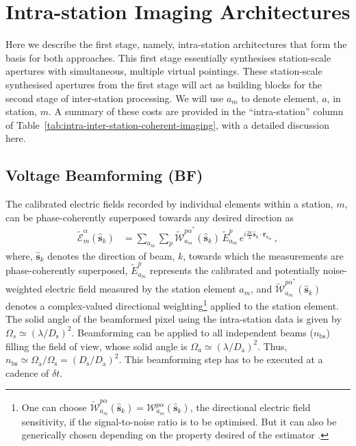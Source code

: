 \documentclass[
  journal=pasa,
  manuscript=article-type,
  year=2020,
  volume=37,
]{cup-journal}
\begin{document}
\section{Intra-station Imaging Architectures} \label{sec:intra-station-arch}

Here we describe the first stage, namely, intra-station architectures that form the basis for both approaches. This first stage essentially synthesises station-scale apertures with simultaneous, multiple virtual pointings. These station-scale synthesised apertures from the first stage will act as building blocks for the second stage of inter-station processing. We will use $a_m$ to denote element, $a$, in station, $m$. A summary of these costs are provided in the ``intra-station'' column of Table~\ref{tab:intra-inter-station-coherent-imaging}, with a detailed discussion here. 

\subsection{Voltage Beamforming (BF)}

The calibrated electric fields recorded by individual elements within a station, $m$, can be phase-coherently superposed towards any desired direction as
\begin{align}
    \widetilde{\mathcal{E}}_m^\alpha(\hat{\boldsymbol{s}}_k) &= \sum_{a_m} \sum_p  \widetilde{\mathcal{W}}_{a_m}^{{p\alpha}^*}(\hat{\boldsymbol{s}}_k) \, \widetilde{E}_{a_m}^p \, e^{i\frac{2\pi}{\lambda} \hat{\boldsymbol{s}}_k\cdot\boldsymbol{r}_{a_m}} \, , \label{eqn:intra-station-pol-hol-img-expl}
\end{align}
where, $\hat{\boldsymbol{s}}_k$ denotes the direction of beam, $k$, towards which the measurements are phase-coherently superposed, $\widetilde{E}_{a_m}^{p}$ represents the calibrated and potentially noise-weighted electric field measured by the station element $a_m$, and $\widetilde{\mathcal{W}}_{a_m}^{{p\alpha}^*}(\hat{\boldsymbol{s}}_k)$ denotes a complex-valued directional weighting\footnote{One can choose $\widetilde{\mathcal{W}}_{a_m}^{p\alpha}(\hat{\boldsymbol{s}}_k)=\mathcal{W}_{a_m}^{p\alpha}(\hat{\boldsymbol{s}}_k)$, the directional electric field sensitivity, if the signal-to-noise ratio is to be optimised. But it can also be generically chosen depending on the property desired of the estimator \cite[][]{Morales2011}.} applied to the station element. The solid angle of the beamformed pixel using the intra-station data is given by $\Omega_s \simeq (\lambda/D_\textrm{s})^2$. Beamforming can be applied to all independent beams ($n_\textrm{bs}$) filling the field of view, whose solid angle is $\Omega_a \simeq (\lambda/D_\textrm{a})^2$. Thus, $n_\textrm{bs} \simeq \Omega_\textrm{a}/\Omega_\textrm{s}=(D_\textrm{s}/D_\textrm{a})^2$. This beamforming step has to be executed at a cadence of $\delta t$. 
\end{document}
